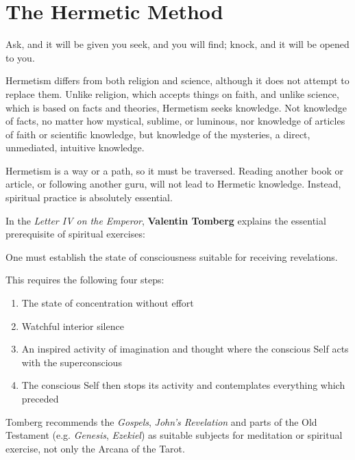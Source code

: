 \section{The Hermetic Method}

\label{sec:HermeticMethod}

\begin{quotex}
Ask, and it will be given you\newline
seek, and you will find;\newline
knock, and it will be opened to you.  
\end{quotex}

Hermetism differs from both religion and science, although it does not attempt to replace them. Unlike religion, which
accepts things on faith, and unlike science, which is based on facts and theories, Hermetism seeks knowledge. Not
knowledge of facts, no matter how mystical, sublime, or luminous, nor knowledge of articles of faith or scientific
knowledge, but knowledge of the mysteries, a direct, unmediated, intuitive knowledge.

Hermetism is a way or a path, so it must be traversed. Reading another book or article, or following another guru, will
not lead to Hermetic knowledge. Instead, spiritual practice is absolutely essential.

In the \textit{Letter IV on the Emperor}, \textbf{Valentin Tomberg} explains the essential prerequisite of spiritual exercises:

\begin{quotex}
One must establish the state of consciousness suitable for receiving revelations. 

\end{quotex}
This requires the following four steps:

\begin{enumerate}
\item The state of concentration without effort 
\item Watchful interior silence 
\item An inspired activity of imagination and thought where the conscious Self acts with the superconscious 
\item The conscious Self then stops its activity and contemplates everything which preceded 
\end{enumerate}
Tomberg recommends the \emph{Gospels}, \emph{John's Revelation} and parts of the Old Testament (e.g.
\emph{Genesis}, \emph{Ezekiel}) as suitable subjects for meditation or spiritual exercise, not only the Arcana of the
Tarot.

